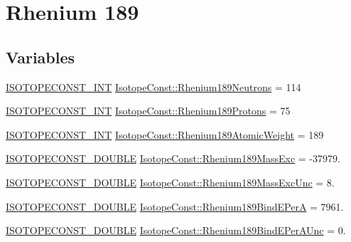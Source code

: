 \hypertarget{group___isotope_const-_rhenium-_re189}{}\section{Rhenium 189}
\label{group___isotope_const-_rhenium-_re189}
\subsection*{Variables}
\begin{DoxyCompactItemize}
\item 
\mbox{\hyperlink{group___isotope_const-_macros_ga5f18360b3e99483a35c32d789e62621c}{I\+S\+O\+T\+O\+P\+E\+C\+O\+N\+S\+T\+\_\+\+I\+NT}} \mbox{\hyperlink{group___isotope_const-_rhenium-_re189_ga54e13c562f82cb0b92e77273e7c500f9}{Isotope\+Const\+::\+Rhenium189\+Neutrons}} = 114
\item 
\mbox{\hyperlink{group___isotope_const-_macros_ga5f18360b3e99483a35c32d789e62621c}{I\+S\+O\+T\+O\+P\+E\+C\+O\+N\+S\+T\+\_\+\+I\+NT}} \mbox{\hyperlink{group___isotope_const-_rhenium-_re189_ga7efff46c29b9351935cabd1d6ee73e88}{Isotope\+Const\+::\+Rhenium189\+Protons}} = 75
\item 
\mbox{\hyperlink{group___isotope_const-_macros_ga5f18360b3e99483a35c32d789e62621c}{I\+S\+O\+T\+O\+P\+E\+C\+O\+N\+S\+T\+\_\+\+I\+NT}} \mbox{\hyperlink{group___isotope_const-_rhenium-_re189_ga0b7490c9ca01ea3c0424ac86267e9726}{Isotope\+Const\+::\+Rhenium189\+Atomic\+Weight}} = 189
\item 
\mbox{\hyperlink{group___isotope_const-_macros_ga8f45a7272ce02c0b4c65c44636ed719a}{I\+S\+O\+T\+O\+P\+E\+C\+O\+N\+S\+T\+\_\+\+D\+O\+U\+B\+LE}} \mbox{\hyperlink{group___isotope_const-_rhenium-_re189_gaa813f2a9c9f24d147c4f5f7748ced118}{Isotope\+Const\+::\+Rhenium189\+Mass\+Exc}} = -\/37979.
\item 
\mbox{\hyperlink{group___isotope_const-_macros_ga8f45a7272ce02c0b4c65c44636ed719a}{I\+S\+O\+T\+O\+P\+E\+C\+O\+N\+S\+T\+\_\+\+D\+O\+U\+B\+LE}} \mbox{\hyperlink{group___isotope_const-_rhenium-_re189_gaa7f2d03b5e5d04dbf90f219ec85de4ce}{Isotope\+Const\+::\+Rhenium189\+Mass\+Exc\+Unc}} = 8.
\item 
\mbox{\hyperlink{group___isotope_const-_macros_ga8f45a7272ce02c0b4c65c44636ed719a}{I\+S\+O\+T\+O\+P\+E\+C\+O\+N\+S\+T\+\_\+\+D\+O\+U\+B\+LE}} \mbox{\hyperlink{group___isotope_const-_rhenium-_re189_gac58131661639cf6a6e6e6f5c2fe9aa56}{Isotope\+Const\+::\+Rhenium189\+Bind\+E\+PerA}} = 7961.
\item 
\mbox{\hyperlink{group___isotope_const-_macros_ga8f45a7272ce02c0b4c65c44636ed719a}{I\+S\+O\+T\+O\+P\+E\+C\+O\+N\+S\+T\+\_\+\+D\+O\+U\+B\+LE}} \mbox{\hyperlink{group___isotope_const-_rhenium-_re189_ga927cdef859730ddeb2be1c7883690dce}{Isotope\+Const\+::\+Rhenium189\+Bind\+E\+Per\+A\+Unc}} = 0.

\end{DoxyCompactItemize}
